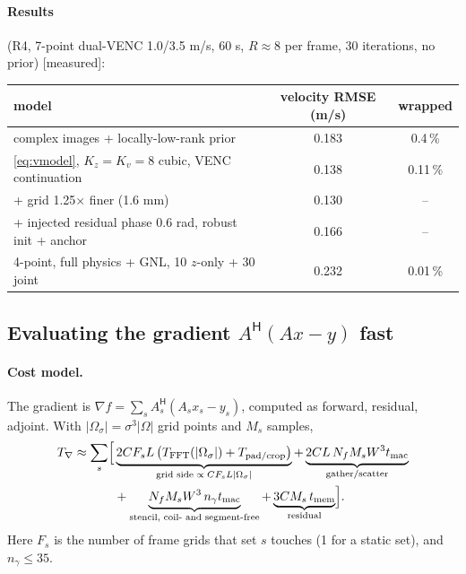 \documentclass[11pt]{article}
\theoremstyle{remark}
\newcommand{\herm}{\mathsf H}
\begin{document}
\paragraph{Results} (R4, 7-point dual-VENC 1.0/3.5 m/s, 60 s, $R\approx8$ per frame, 30 iterations, no prior) [measured]:
\begin{center}
\begin{tabular}{lcc}
\toprule
model & velocity RMSE (m/s) & wrapped\\
\midrule
complex images + locally-low-rank prior & 0.183 & 0.4\,\%\\
\cref{eq:vmodel}, $K_z=K_v=8$ cubic, VENC continuation & 0.138 & 0.11\,\%\\
\quad + grid 1.25$\times$ finer (1.6 mm) & 0.130 & --\\
\quad + injected residual phase 0.6 rad, robust init + anchor & 0.166 & --\\
4-point, full physics + GNL, 10 $z$-only + 30 joint & 0.232 & 0.01\,\%\\
\bottomrule
\end{tabular}
\end{center}

\subsection{Evaluating the gradient \texorpdfstring{$A^\herm(Ax-y)$}{AH(Ax-y)} fast}
\label{sec:grad}

\paragraph{Cost model.} The gradient is $\nabla f=\sum_sA_s^\herm(A_sx_s-y_s)$, computed as forward, residual, adjoint. With $|\Omega_\sigma|=\sigma^3|\Omega|$ grid points and $M_s$ samples,
\begin{equation}
  \begin{aligned}
  T_\nabla\approx\sum_s\Bigl[&\underbrace{2CF_sL\,\bigl(T_{\rm FFT}(|\Omega_\sigma|)+T_{\rm pad/crop}\bigr)}_{\text{grid side}\;\propto\;CF_sL|\Omega_\sigma|}
  +\underbrace{2CL\,N_fM_sW^3t_{\rm mac}}_{\text{gather/scatter}}\\
  &+\underbrace{N_fM_sW^3\,n_\gamma t_{\rm mac}}_{\text{stencil, coil- and segment-free}}
  +\underbrace{3CM_s\,t_{\rm mem}}_{\text{residual}}\Bigr].
  \end{aligned}
  \label{eq:tcost}
\end{equation}
Here $F_s$ is the number of frame grids that set $s$ touches (1 for a static set), and $n_\gamma\le35$.
\end{document}
